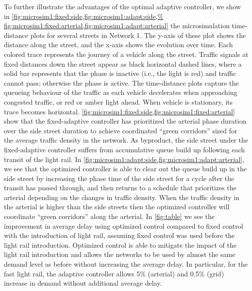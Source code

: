 To further illustrate the advantages of the optimal adaptive controller, we show
in \cref{fig:microsim1:fixed:side,fig:microsim1:adapt:side,%
fig:microsim1:fixed:arterial,fig:microsim1:adapt:arterial} the microsimulation
time-distance plots for several streets in Network 1.
%
The y-axis of these plot shows the distance along the street, and the x-axis
shows the evolution over time.
%
Each colored trace represents the journey of a vehicle along the street.
%
Traffic signals at fixed distances down the street appear as black horizontal
dashed lines, where a solid bar represents that the phase is inactive (i.e., the
light is red) and traffic cannot pass; otherwise the phase is active.
%
%
The time-distance plots capture the queueing behaviour of the traffic as each
vehicle decelerates when approaching congested traffic, or red or amber light
ahead.
%
When vehicle is stationary, its trace becomes horizontal.
%
\cref{fig:microsim1:fixed:side,fig:microsim1:fixed:arterial} show that the
fixed-adaptive controller has prioritized the arterial phase duration over the
side street duration to achieve coordinated ``green corridors'' sized for the
average traffic density in the network.
%
As byproduct, the side street under the fixed-adaptive controller suffers from
accumulative queue build up following each transit of the light rail.
%
In \cref{fig:microsim1:adapt:side,fig:microsim1:adapt:arterial}, we see that the
optimized controller is able to clear out the queue build up in the side street
by increasing the phase time of the side street for a cycle after the transit
has passed through, and then returns to a schedule that prioritizes the arterial
depending on the changes in traffic density.
%
When the traffic density in the arterial is higher than the side streets then
the optimized controller will coordinate ``green corridors'' along the
arterial.
%
In \cref{fig:table} we see the improvement in average delay using optimized
control compared to fixed control with the introduction of light rail, assuming
fixed control was used before the light rail introduction.
%
Optimized control is able to mitigate the impact of the light rail introduction
and allows the networks to be used by almost the same demand level as before
without increasing the average delay.
%
In particular, for the fast light rail, the adaptive controller allows 5\%
(arterial) and 0.5\% (grid) increase in demand without additional average delay.


